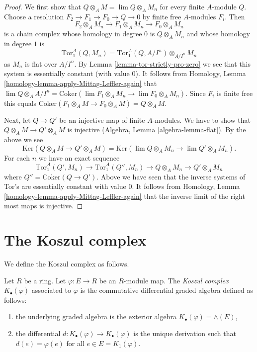 \begin{proof}
We first show that $Q \otimes_A M = \lim Q \otimes_A M_n$ for every finite
$A$-module $Q$. Choose a resolution $F_2 \to F_1 \to F_0 \to Q \to 0$
by finite free $A$-modules $F_i$. Then
$$
F_2 \otimes_A M_n \to F_1 \otimes_A M_n \to F_0 \otimes_A M_n
$$
is a chain complex whose homology in degree $0$ is $Q \otimes_A M_n$
and whose homology in degree $1$ is
$$
\text{Tor}_1^A(Q, M_n) = \text{Tor}_1^A(Q, A/I^n) \otimes_{A/I^n} M_n
$$
as $M_n$ is flat over $A/I^n$. By Lemma \ref{lemma-tor-strictly-pro-zero}
we see that this system is essentially constant (with value $0$).
It follows from Homology, Lemma \ref{homology-lemma-apply-Mittag-Leffler-again}
that $\lim Q \otimes_A A/I^n =
\text{Coker}(\lim F_1 \otimes_A M_n \to \lim F_0 \otimes_A M_n)$.
Since $F_i$ is finite free this equals
$\text{Coker}(F_1 \otimes_A M \to F_0 \otimes_A M) = Q \otimes_A M$.

\medskip\noindent
Next, let $Q \to Q'$ be an injective map of finite $A$-modules.
We have to show that $Q \otimes_A M \to Q' \otimes_A M$ is injective
(Algebra, Lemma \ref{algebra-lemma-flat}). By the above we see
$$
\text{Ker}(Q \otimes_A M \to Q' \otimes_A M) =
\text{Ker}(\lim Q \otimes_A M_n \to \lim Q' \otimes_A M_n).
$$
For each $n$ we have an exact sequence
$$
\text{Tor}_1^A(Q', M_n) \to \text{Tor}_1^A(Q'', M_n) \to
Q \otimes_A M_n \to Q' \otimes_A M_n
$$
where $Q'' = \text{Coker}(Q \to Q')$. Above we have seen that the
inverse systems of Tor's are essentially constant with value $0$.
It follows from
Homology, Lemma \ref{homology-lemma-apply-Mittag-Leffler-again}
that the inverse limit of the right most maps is injective.
\end{proof}











\section{The Koszul complex}
\label{section-koszul}

\noindent
We define the Koszul complex as follows.

\begin{definition}
\label{definition-koszul}
Let $R$ be a ring. Let $\varphi : E \to R$ be an $R$-module map. The
{\it Koszul complex} $K_\bullet(\varphi)$ associated to $\varphi$
is the commutative differential graded algebra defined as follows:
\begin{enumerate}
\item the underlying graded algebra is the exterior algebra
$K_\bullet(\varphi) = \wedge(E)$,
\item the differential $d : K_\bullet(\varphi) \to K_\bullet(\varphi)$
is the unique derivation such that $d(e) = \varphi(e)$ for all
$e \in E = K_1(\varphi)$.
\end{enumerate}
\end{definition}

